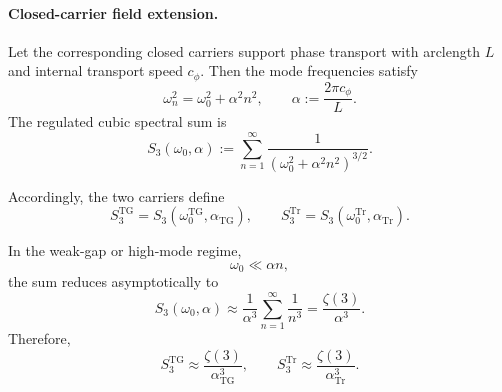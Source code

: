 \documentclass[11pt]{article}
\begin{document}
    \paragraph{Closed-carrier field extension.}
        Let the corresponding closed carriers support phase transport with arclength \(L\) and internal
        transport speed \(c_\phi\). Then the mode frequencies satisfy
        \begin{equation}
            \omega_n^2 = \omega_0^2 + \alpha^2 n^2,
            \qquad
            \alpha := \frac{2\pi c_\phi}{L}.
            \label{eq:toy_dispersion_alpha}
        \end{equation}
        The regulated cubic spectral sum is
        \begin{equation}
            S_3(\omega_0,\alpha)
            :=
            \sum_{n=1}^{\infty}
            \frac{1}{\left(\omega_0^2+\alpha^2 n^2\right)^{3/2}}.
            \label{eq:S3_toy}
        \end{equation}
        
        Accordingly, the two carriers define
        \begin{equation}
            S_3^{\mathrm{TG}}
            =
            S_3\!\left(\omega_0^{\mathrm{TG}},\alpha_{\mathrm{TG}}\right),
            \qquad
            S_3^{\mathrm{Tr}}
            =
            S_3\!\left(\omega_0^{\mathrm{Tr}},\alpha_{\mathrm{Tr}}\right).
            \label{eq:S3_TG_TR}
        \end{equation}
        
        In the weak-gap or high-mode regime,
        \begin{equation}
            \omega_0 \ll \alpha n,
        \end{equation}
        the sum reduces asymptotically to
        \begin{equation}
            S_3(\omega_0,\alpha)
            \approx
            \frac{1}{\alpha^3}\sum_{n=1}^{\infty}\frac{1}{n^3}
            =
            \frac{\zeta(3)}{\alpha^3}.
            \label{eq:S3_asymptotic_toy}
        \end{equation}
        Therefore,
        \begin{equation}
            S_3^{\mathrm{TG}}
            \approx
            \frac{\zeta(3)}{\alpha_{\mathrm{TG}}^3},
            \qquad
            S_3^{\mathrm{Tr}}
            \approx
            \frac{\zeta(3)}{\alpha_{\mathrm{Tr}}^3}.
            \label{eq:S3_compare_asymptotic}
        \end{equation}
    
\end{document}
